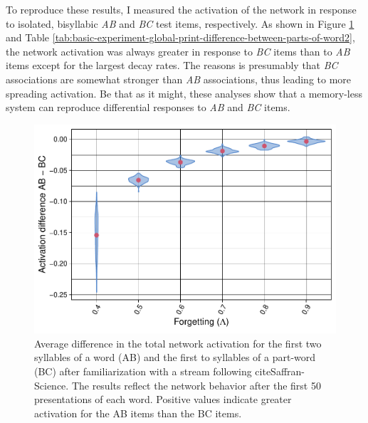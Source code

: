 \documentclass[
]{article}
\begin{document}
To reproduce these results, I measured the activation of the network in
response to isolated, bisyllabic \emph{AB} and \emph{BC} test items,
respectively. As shown in Figure
\ref{fig:basic-experiment-global-print-act-after-2syll-plot} and Table
\ref{tab:basic-experiment-global-print-difference-between-parts-of-word2},
the network activation was always greater in response to \emph{BC} items
than to \emph{AB} items except for the largest decay rates. The reasons
is presumably that \emph{BC} associations are somewhat stronger than
\emph{AB} associations, thus leading to more spreading activation. Be
that as it might, these analyses show that a memory-less system can
reproduce differential responses to \emph{AB} and \emph{BC} items.

\begin{figure}
\includegraphics[width=1\linewidth]{tp_model_entrainment_files/figure-latex/basic-experiment-global-print-act-after-2syll-plot-1} \caption{Average difference in the total network activation for the first two syllables of a word (AB) and the first to syllables of a part-word (BC) after familiarization with a stream following cite{Saffran-Science}. The results reflect the network behavior after the first 50 presentations of each word. Positive values indicate greater activation for the AB items than the BC items.}\label{fig:basic-experiment-global-print-act-after-2syll-plot}
\end{figure}
\end{document}
